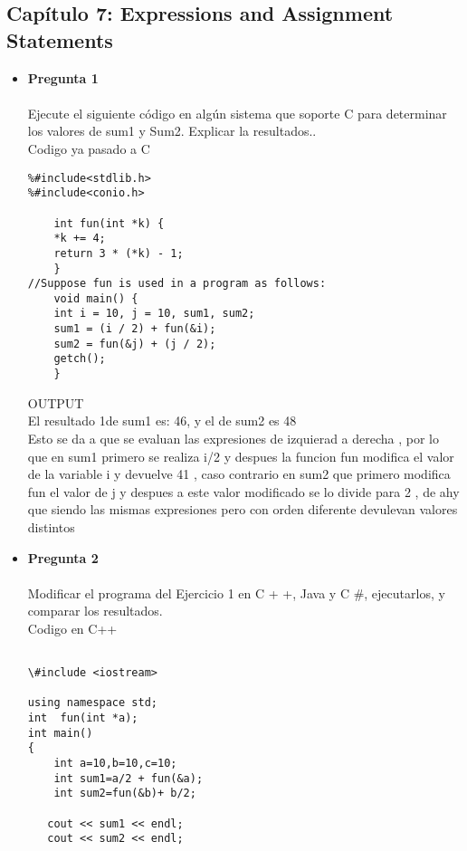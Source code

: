 \documentclass[12pt,oneside]{article}
\begin{document}
\begin{itemize}
\end{itemize}
\subsection{Capítulo 7: Expressions and Assignment Statements}
\begin{itemize}
\item {\bf Pregunta 1} \\\\
Ejecute el siguiente código  en algún sistema 
que soporte C para determinar los valores de sum1 y Sum2. Explicar la 
resultados..\\
Codigo ya pasado a  C\\
\begin{lstlisting}[frame=single]  % Start your code-block
%#include<stdio.h>
%#include<stdlib.h>
%#include<conio.h>

	int fun(int *k) {
	*k += 4;
	return 3 * (*k) - 1;
	}
//Suppose fun is used in a program as follows:
	void main() {
	int i = 10, j = 10, sum1, sum2;
	sum1 = (i / 2) + fun(&i);
	sum2 = fun(&j) + (j / 2);
	getch();
	}

\end{lstlisting}
OUTPUT\\
El resultado 1de sum1 es: 46, y el de sum2 es 48\\
Esto se da a que se evaluan las expresiones de izquierad a derecha , por lo que en sum1  primero se realiza i/2 y despues la funcion fun modifica el valor de la variable i y devuelve 41  , caso contrario en sum2 que primero modifica fun el valor de j y despues a este valor modificado se lo divide para 2 , de ahy que siendo las mismas expresiones pero con orden diferente devulevan valores distintos

\item {\bf Pregunta 2} \\\\
Modificar el programa del Ejercicio  1 en C + +, Java y C \#, 
ejecutarlos, y comparar los resultados.\\

Codigo en C++\\
\begin{lstlisting}[frame=single]  % Start your code-block

\#include <iostream>

using namespace std;
int  fun(int *a); 
int main()
{
    int a=10,b=10,c=10;
    int sum1=a/2 + fun(&a);
    int sum2=fun(&b)+ b/2;
    
   cout << sum1 << endl; 
   cout << sum2 << endl; 
   

\end{lstlisting}
\end{itemize}
\end{document}
